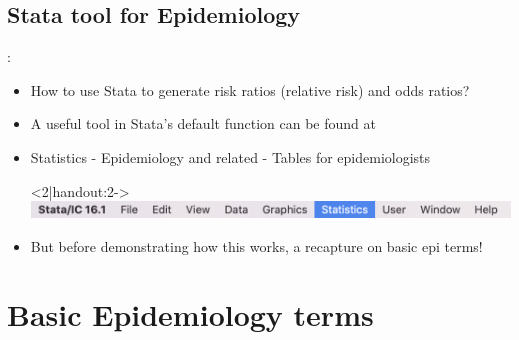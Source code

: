 \subsection{Stata tool for Epidemiology}
\begin{frame}{\secname: \subsecname}
\begin{itemize}
	\item How to use Stata to generate risk ratios (relative risk) and odds ratios?
	\item<2|handout:2-> A useful tool in Stata's default function can be found at 
	\item<2|handout:2-> Statistics - Epidemiology and related - Tables for epidemiologists
	\item[]<2|handout:2-> \includegraphics[scale=0.5]{image/bar}
	\item<3|handout:3> But before demonstrating how this works, a recapture on basic epi terms!
\end{itemize}

\end{frame}
\section{Basic Epidemiology terms}
